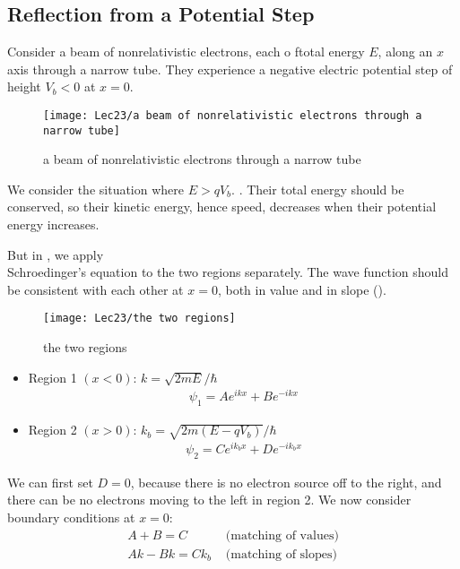 \subsection{Reflection from a Potential Step}
Consider a beam of nonrelativistic electrons, each o ftotal energy $E$, along an $x$ axis through a narrow tube. They experience a negative electric potential step of height $V_b<0$ at $x=0$. 

\begin{figure}[H]
    \centering
    \texttt{[image: Lec23/a beam of nonrelativistic electrons through a narrow tube]}
    \caption{a beam of nonrelativistic electrons through a narrow tube}
\end{figure}

We consider the situation where $E>qV_b$. . Their total energy should be conserved, so their kinetic energy, hence speed, decreases when their potential energy increases. 

But in , we apply\\ Schroedinger's equation to the two regions separately. The wave function should be consistent with each other at $x=0$, both in value and in slope (). 

\begin{figure}[H]
    \centering
    \texttt{[image: Lec23/the two regions]}
    \caption{the two regions}
\end{figure}

\begin{itemize}
    \item Region 1 $(x<0)$: $k=\sqrt{2mE}/\hbar$
    \begin{align*}
        \psi_1=Ae^{ikx}+Be^{-ikx}
    \end{align*}
    \item Region 2 $(x>0)$: $k_b=\sqrt{2m(E-qV_b)}/\hbar$
    \begin{align*}
        \psi_2=Ce^{ik_b x}+De^{-ik_b x}
    \end{align*}
\end{itemize}

We can first set $D=0$, because there is no electron source off to the right, and there can be no electrons moving to the left in region 2. We now consider boundary conditions at $x=0$:
\begin{align*}
    A+B=C &\text{ (matching of values)}\\
    Ak-Bk=Ck_b &\text{ (matching of slopes)}
\end{align*}

